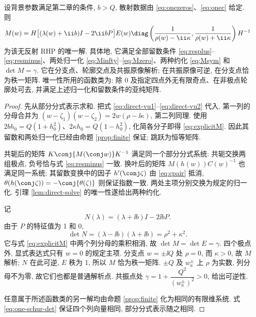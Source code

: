 \begin{theorem}\label{thm:oneRHP}\label{prop:unique-reflectionless}
设背景参数满足第二章的条件, $b>Q$, 散射数据由 \eqref{eq:onezeros}、\eqref{eq:onec} 给定. 则
\begin{equation}\label{eq:explicitM}
M(w)=H\bigl[(\lambda(w)+\ii b)I-2\ii bP\bigr]E(w)
\diag\left(\dfrac{1}{\rho(w)-\ii\kappa},
\dfrac{1}{\rho(w)+\ii\kappa}\right)H^{-1}
\end{equation}
为该无反射 RHP 的唯一解. 具体地, 它满足全部留数条件 \eqref{eq:resplus}--\eqref{eq:resminus}、两处归一化 \eqref{eq:Minfty}--\eqref{eq:Mzero}、两种约化 \eqref{eq:Msym} 和 $\det M=\gamma$. 它在分支点、轮廓交点及共振原像解析; 在共振原像可逆, 在分支点恰为秩一矩阵. 唯一性所用的函数类为: 除 $0$ 及指定四点外无有限奇点、在非极点轮廓处可去, 并满足上述归一化和留数条件的亚纯矩阵.
\end{theorem}
\begin{proof}
先从部分分式表示求和. 把式 \eqref{eq:direct-vu1}--\eqref{eq:direct-vu2} 代入, 第一列的分母合并为
$(w-\zeta_1)(w-\zeta_2)=2w(\rho-\ii\kappa)$, 第二列同理. 使用
$2bh_0=Q(1+h_0^2)$、$2\kappa h_0=Q(1-h_0^2)$, 化简各分子即得 \eqref{eq:explicitM}. 因此其留数和两处归一化已经由命题 \ref{prop:finite} 保证; 跳跃为恒等矩阵.

共轭后的矩阵 $K\conj{M(\conj w)}K^{-1}$ 满足同一个部分分式系统: 共轭交换两组极点, 负号恰与式 \eqref{eq:resminus} 一致. 换叶后的矩阵 $M(h(w))C(w)^{-1}$ 也满足同一系统; 其留数变换中的因子 $h'(\conj\zeta)$ 由 \eqref{eq:cpair} 抵消, $\theta(h(\conj\zeta))=-\conj{\theta(\zeta)}$ 则保证指数一致. 两处主项分别交换为规定的归一化. 引理 \ref{lem:direct-solve} 的唯一性遂给出两种约化.

记
\begin{equation}\label{eq:Nfactor}
N(\lambda)=(\lambda+\ii b)I-2\ii bP.
\end{equation}
由于 $P$ 的特征值为 1 和 0,
\[
\det N=(\lambda-\ii b)(\lambda+\ii b)
=\rho^2+\kappa^2.
\]
它与式 \eqref{eq:explicitM} 中两个列分母的乘积相消, 故 $\det M=\det E=\gamma$. 四个极点外, 显式表达式只有 $w=0$ 的规定主项. 分支点 $w=\pm\ii Q$ 处 $\rho=0$, 而 $\kappa>0$, 故 $M$ 解析; $N$ 在此可逆, $E$ 秩为 1, 所以 $M$ 恰为秩一矩阵. $\pm Q$ 及 $w_a^\pm$ 上 $\rho$ 为实数, 列分母不为零, 故它们也都是普通解析点. 共振点处 $\gamma=1+\dfrac{Q^2}{(w_a^\pm)^2}>0$, 给出可逆性.

任意属于所述函数类的另一解均由命题 \ref{prop:finite} 化为相同的有限维系统. 式 \eqref{eq:one-schur-det} 保证四个列向量相同, 部分分式表示随之相同.
\end{proof}

